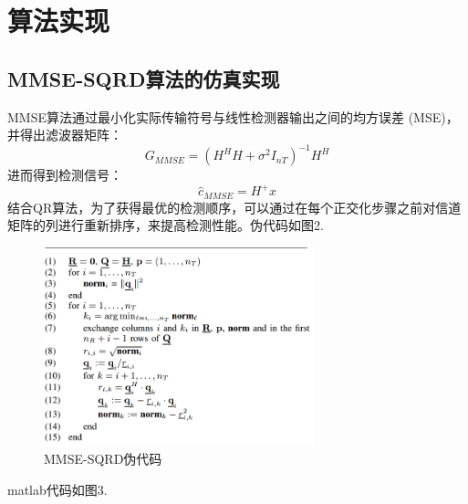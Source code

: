 \documentclass[a4paper,12pt]{article}
\begin{document}
	\section{算法实现}
	\subsection{MMSE-SQRD算法的仿真实现}
	MMSE算法通过最小化实际传输符号与线性检测器输出之间的均方误差 (MSE)，并得出滤波器矩阵：	$$G_{MMSE}=(H^HH+\sigma^2I_{nT})^{-1}H^H$$
	进而得到检测信号：
	$$\hat{c}_{MMSE}=H^{+}x$$
	结合QR算法，为了获得最优的检测顺序，可以通过在每个正交化步骤之前对信道矩阵的列进行重新排序，来提高检测性能。伪代码如图2.\par 
	\begin{figure}[h]
		\centering
		\includegraphics[width=0.7\textwidth]{2.png}
		\caption{MMSE-SQRD伪代码}
	\end{figure}
	matlab代码如图3.
	\newpage
\end{document}
